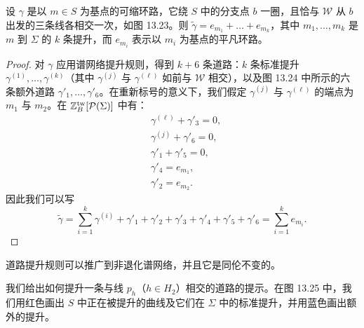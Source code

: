 \begin{lemma}[13.31]
设 $\gamma$ 是以 $m\in S$ 为基点的可缩环路，它绕 $S$ 中的分支点 $b$ 一圈，且恰与 $\mathcal{W}$ 从 $b$ 出发的三条线各相交一次，如图 13.23。则 $\tilde\gamma=e_{m_1}+\dots+e_{m_k}$，其中 $m_1,\dots,m_k$ 是 $m$ 到 $\Sigma$ 的 $k$ 条提升，而 $e_{m_i}$ 表示以 $m_i$ 为基点的平凡环路。
\end{lemma}


\begin{proof}
对 $\gamma$ 应用谱网络提升规则，得到 $k+6$ 条道路：$k$ 条标准提升 $\gamma^{(1)},\dots,\gamma^{(k)}$（其中 $\gamma^{(j)}$ 与 $\gamma^{(\ell)}$ 如前与 $\mathcal{W}$ 相交），以及图 13.24 中所示的六条额外道路 $\gamma'_1,\dots,\gamma'_6$。在重新标号的意义下，我们假定 $\gamma^{(j)}$ 与 $\gamma^{(\ell)}$ 的端点为 $m_1$ 与 $m_2$。在 $\mathbb{Z}^{\mathrm{tw}}_B[\mathcal{P}(\Sigma)]$ 中有：
\[
\begin{aligned}
&\gamma^{(\ell)}+\gamma'_3=0,\\
&\gamma^{(j)}+\gamma'_6=0,\\
&\gamma'_1+\gamma'_5=0,\\
&\gamma'_4=e_{m_1},\\
&\gamma'_2=e_{m_2}.
\end{aligned}
\]
因此我们可以写
\[
\tilde\gamma=\sum_{i=1}^{k}\gamma^{(i)}+\gamma'_1+\gamma'_2+\gamma'_3+\gamma'_4+\gamma'_5+\gamma'_6=\sum_{i=1}^{k}e_{m_i}.
\]
\end{proof}


\begin{exercise}
道路提升规则可以推广到非退化谱网络，并且它是同伦不变的。
\end{exercise}

我们给出如何提升一条与线 $p_h$（$h\in H_2$）相交的道路的提示。在图 13.25 中，我们用红色画出 $S$ 中正在被提升的曲线及它们在 $\Sigma$ 中的标准提升，并用蓝色画出额外的提升。

